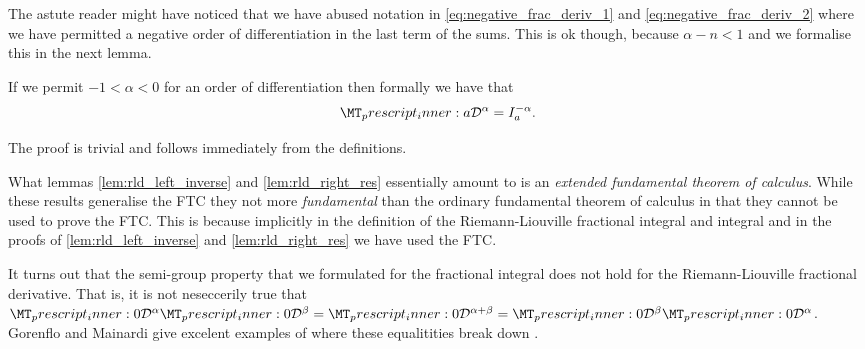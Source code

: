 The astute reader might have noticed that we have abused notation in \eqref{eq:negative_frac_deriv_1} and \eqref{eq:negative_frac_deriv_2} where we have permitted a negative order of differentiation in the last term of the sums. This is ok though, because $ \alpha - n < 1 $ and we formalise this in the next lemma. 
\begin{mdframed}[innertopmargin=10pt]
\begin{lemma}
    If we permit $ -1 < \alpha < 0 $ for an order of differentiation then formally we have that
    \begin{align*}
        \prescript{}{a}{\mathcal{D}}^\alpha = I_a^{-\alpha}.
    \end{align*}
\end{lemma}
\end{mdframed}
The proof is trivial and follows immediately from the definitions.

What lemmas \ref{lem:rld_left_inverse} and \ref{lem:rld_right_res} essentially amount to is an \emph{extended fundamental theorem of calculus}. While these results generalise the FTC they not more \emph{fundamental} than the ordinary fundamental theorem of calculus in that they cannot be used to prove the FTC. This is because implicitly in the definition of the Riemann-Liouville fractional integral and integral and in the proofs of \ref{lem:rld_left_inverse} and \ref{lem:rld_right_res} we have used the FTC.

It turns out that the semi-group property that we formulated for the fractional integral does not hold for the Riemann-Liouville fractional derivative.
That is, it is not neseccerily true that $ \prescript{}{0}{\mathcal{D}}^\alpha \prescript{}{0}{\mathcal{D}}^\beta =  \prescript{}{0}{\mathcal{D}}^{\alpha + \beta} =  \prescript{}{0}{\mathcal{D}}^\beta  \prescript{}{0}{\mathcal{D}}^\alpha $. Gorenflo and Mainardi give excelent examples of where these equalitities break down \cite{Gorenflo1997}.

